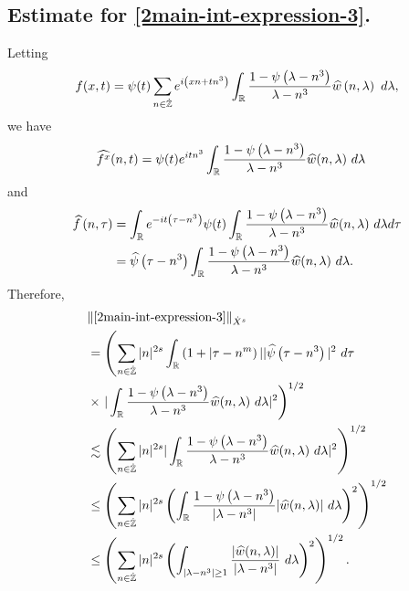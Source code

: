 \subsection{Estimate for \ref{2main-int-expression-3}.}
Letting $$f(x,t) = \psi(t) \sum_{n \in \dot{\mathbb{Z}}} e^{i\left( xn + tn^{3} \right)} 
\int_{\mathbb{R}} \frac{1 - \psi\left( \lambda - n^{3} \right)}{\lambda - n^{3}} 
\widehat{w} \left( n, \lambda \right) \ d \lambda,$$ we have
%
%
\begin{equation*}
	\begin{split}
		& \widehat{f^x}(n, t) = \psi(t) e^{itn^{3}} \int_{\mathbb{R}}
		\frac{1 - \psi\left( \lambda - n^{3} \right)}{\lambda - n^{3}} 
		\widehat{w}(n, \lambda) \ d \lambda
	\end{split}
\end{equation*}
and
\begin{equation*}
	\begin{split}
		 \widehat{f}\left( n, \tau \right)
		 & = \int_{\mathbb{R}} e^{-it\left( \tau - n^{3} 
		\right)} \psi(t) \int_{\mathbb{R}} \frac{1 - \psi\left( 
		\lambda - n^{3} 
		\right)}{\lambda - n^{3}} \widehat{w}(n, \lambda) \ d \lambda d \tau
		\\
		& = \widehat{\psi}\left( \tau - n^{3} \right) \int_{\mathbb{R}} 
		\frac{1 - \psi\left( 
		\lambda - n^{3} 
		\right)}{\lambda - n^{3}} \widehat{w}(n, \lambda) \ d \lambda.
	\end{split}
\end{equation*}
Therefore,
%
%
\begin{equation*}
	\begin{split}
		& \| \eqref{2main-int-expression-3} \|_{\dot{X}^s} 
		\\
		& = \left( \sum_{n \in \dot{\mathbb{Z}}} |n|^{2s} \int_{\mathbb{R}} \left( 1 + | \tau - n^{m
		} \right ) | | \widehat{\psi}\left( \tau - n^3 \right) |^2 \ d \tau
		\right.
		\\
		& \times \left . |
		\int_{\mathbb{R}} \frac{1 - \psi\left( \lambda - n^3 \right)}{\lambda -
		n^3} \widehat{w}(n, \lambda) \ d \lambda |^2  \right)^{1/2}
		\\
		& \lesssim \left( \sum_{n \in \dot{\mathbb{Z}}} |n|^{2s} | \int_{\mathbb{R}}
		\frac{1 - \psi\left( \lambda - n^3 \right)}{\lambda - n^3}
		\widehat{w}(n, \lambda) \ d\lambda |^2 \right)^{1/2}
		\\
		& \le \left( \sum_{n \in \dot{\mathbb{Z}}} |n|^{2s}  \left ( \int_{\mathbb{R}}
		\frac{1 - \psi\left( \lambda - n^3 \right)}{|\lambda - n^3|}
		|\widehat{w}(n, \lambda) | \ d\lambda \right )^2 \right)^{1/2}
		\\
		& \le \left( \sum_{n \in \dot{\mathbb{Z}}} |n|^{2s}  \left ( \int_{| \lambda - 
		n^3 | \ge 1}
		\frac{|\widehat{w}(n, \lambda) | }{|\lambda - n^3|}
		\ d\lambda \right )^2 \right)^{1/2}.
	\end{split}
\end{equation*}
